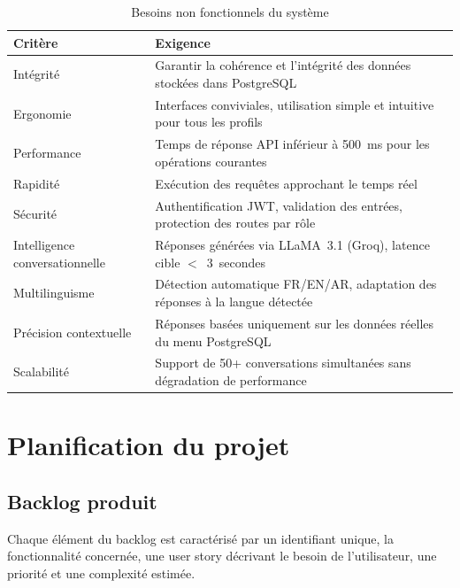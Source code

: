 \begin{table}[H]
    \centering
    \caption{Besoins non fonctionnels du système}
    \label{tab:non_fonctionnels}
    \begin{tabularx}{\textwidth}{|L{4cm}|X|}
        \hline
        \textbf{Critère} & \textbf{Exigence} \\
        \hline
        Intégrité &
        Garantir la cohérence et l'intégrité des données stockées dans PostgreSQL \\
        \hline
        Ergonomie &
        Interfaces conviviales, utilisation simple et intuitive pour tous les profils \\
        \hline
        Performance &
        Temps de réponse API inférieur à 500~ms pour les opérations courantes \\
        \hline
        Rapidité &
        Exécution des requêtes approchant le temps réel \\
        \hline
        Sécurité &
        Authentification JWT, validation des entrées, protection des routes par rôle \\
        \hline
        Intelligence conversationnelle &
        Réponses générées via LLaMA~3.1 (Groq), latence cible $<$~3~secondes \\
        \hline
        Multilinguisme &
        Détection automatique FR/EN/AR, adaptation des réponses à la langue détectée \\
        \hline
        Précision contextuelle &
        Réponses basées uniquement sur les données réelles du menu PostgreSQL \\
        \hline
        Scalabilité &
        Support de 50+ conversations simultanées sans dégradation de performance \\
        \hline
    \end{tabularx}
\end{table}

\section{Planification du projet}

\subsection{Backlog produit}

Chaque élément du backlog est caractérisé par un identifiant unique, la fonctionnalité
concernée, une user story décrivant le besoin de l'utilisateur, une priorité et une
complexité estimée.

